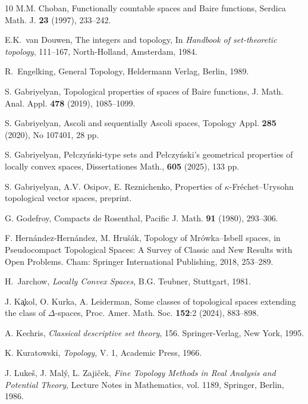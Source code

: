 \documentclass[preprint,11pt]{elsarticle}
\numberwithin{equation}{section}
\numberwithin{theorem}{section}
\begin{document}
\begin{thebibliography}{10}
M.M. Choban, Functionally countable spaces and Baire functions, Serdica Math. J.  \textbf{23} (1997), 233--242.

E.K.~van Douwen, The integers and topology, In {\em Handbook of set-theoretic topology}, 111--167, North-Holland, Amsterdam, 1984.

R.~Engelking, General Topology, Heldermann Verlag, Berlin, 1989.



S. Gabriyelyan, Topological properties of spaces of Baire functions, J. Math. Anal. Appl. \textbf{478} (2019), 1085--1099.

S. Gabriyelyan, Ascoli and sequentially Ascoli spaces, Topology Appl. \textbf{285} (2020), No 107401, 28 pp.

S. Gabriyelyan, Pe{\l}czy\'{n}ski-type sets and Pe{\l}czy\'{n}ski's geometrical properties of locally convex spaces, Dissertationes Math., \textbf{605} (2025), 133 pp.

S. Gabriyelyan, A.V. Osipov, E. Reznichenko, Properties of $\kappa$-Fr\'{e}chet--Urysohn topological vector spaces, preprint.

G. Godefroy, Compacts de Rosenthal, Pacific J. Math. \textbf{91} (1980), 293--306.

F. Hern\'{a}ndez-Hern\'{a}ndez, M. Hru\v{s}\'{a}k, Topology of Mr\'{o}wka--Isbell spaces, in Pseudocompact Topological Spaces: A Survey of Classic and New Results with Open Problems. Cham: Springer International Publishing, 2018, 253--289.


H.~Jarchow, \emph{Locally Convex Spaces}, B.G. Teubner, Stuttgart, 1981.


J. K\c{a}kol, O. Kurka, A. Leiderman, Some classes of topological spaces extending the class of $\Delta$-spaces, Proc. Amer. Math. Soc. \textbf{152}:2 (2024), 883--898.

A. Kechris, {\em Classical descriptive set theory}, 156. Springer-Verlag, New York, 1995.


K. Kuratowski, \emph{Topology,} V. 1, Academic Press, 1966.

J. Luke\v{s}, J. Mal\'{y}, L. Zaji\v{c}ek, \emph{Fine Topology Methods in Real Analysis and Potential Theory}, Lecture Notes in Mathematics, vol. 1189, Springer, Berlin, 1986.


\end{thebibliography}
\end{document}
